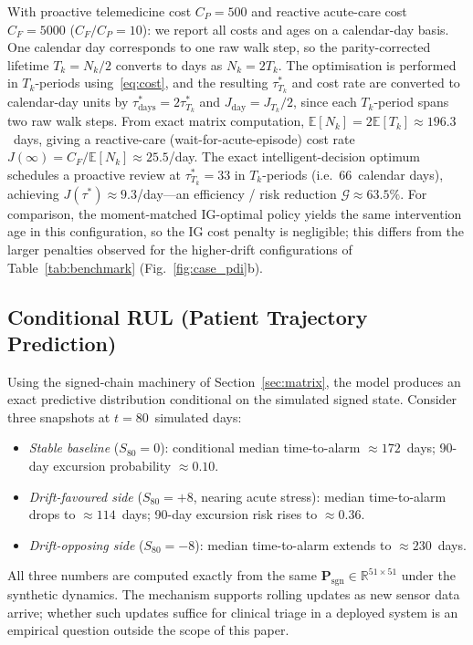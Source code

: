 \documentclass[pdflatex,sn-mathphys-num]{sn-jnl}
\theoremstyle{definition}
\newcommand{\E}{\mathbb{E}}
\numberwithin{equation}{section}
\begin{document}
With proactive telemedicine cost $C_P{=}500$ and reactive acute-care cost $C_F{=}5000$ ($C_F/C_P{=}10$): we report all costs and ages on a calendar-day basis. One calendar day corresponds to one raw walk step, so the parity-corrected lifetime $T_k=N_k/2$ converts to days as $N_k=2T_k$. The optimisation is performed in $T_k$-periods using~\eqref{eq:cost}, and the resulting $\tau^*_{T_k}$ and cost rate are converted to calendar-day units by $\tau^*_{\mathrm{days}}=2\tau^*_{T_k}$ and $J_{\mathrm{day}}=J_{T_k}/2$, since each $T_k$-period spans two raw walk steps. From exact matrix computation, $\E[N_k]=2\E[T_k]\approx 196.3$~days, giving a reactive-care (wait-for-acute-episode) cost rate $J(\infty)=C_F/\E[N_k]\approx 25.5$/day. The exact intelligent-decision optimum schedules a proactive review at $\tau^*_{T_k}=33$ in $T_k$-periods (i.e.\ 66~calendar days), achieving $J(\tau^*)\approx 9.3$/day---an efficiency / risk reduction $\mathcal{G}\approx 63.5\%$. For comparison, the moment-matched IG-optimal policy yields the same intervention age in this configuration, so the IG cost penalty is negligible; this differs from the larger penalties observed for the higher-drift configurations of Table~\ref{tab:benchmark} (Fig.~\ref{fig:case_pdi}b).

\subsection{Conditional RUL (Patient Trajectory Prediction)}\label{sec:case_rul}

Using the signed-chain machinery of Section~\ref{sec:matrix}, the model produces an exact predictive distribution conditional on the simulated signed state. Consider three snapshots at $t=80$~simulated days:
\begin{itemize}
\item \emph{Stable baseline} ($S_{80}{=}0$): conditional median time-to-alarm $\approx 172$~days; 90-day excursion probability $\approx 0.10$.
\item \emph{Drift-favoured side} ($S_{80}{=}+8$, nearing acute stress): median time-to-alarm drops to $\approx 114$~days; 90-day excursion risk rises to $\approx 0.36$.
\item \emph{Drift-opposing side} ($S_{80}{=}-8$): median time-to-alarm extends to $\approx 230$~days.
\end{itemize}
All three numbers are computed exactly from the same $\mathbf{P}_{\mathrm{sgn}}\in\mathbb{R}^{51\times 51}$ under the synthetic dynamics. The mechanism supports rolling updates as new sensor data arrive; whether such updates suffice for clinical triage in a deployed system is an empirical question outside the scope of this paper.
\end{document}
